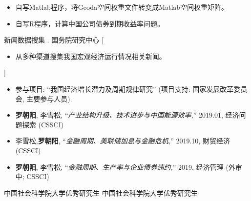 \documentclass[zh]{resume}
\begin{document}
\begin{itemize}
  \item 自写Matlab程序，将Geoda空间权重文件转变成Matlab空间权重矩阵。
  \item 自写R程序，计算中国公司债券到期收益率问题。
\end{itemize}
\begin{experiences}
    {新闻数据搜集 \@. 国务院研究中心}%
    [\begin{itemize}
      \item 从多种渠道搜集我国宏观经济运行情况相关新闻。
    \end{itemize}]%

\end{experiences}
\begin{itemize}
  \small
  \item 参与项目:
    \enquote{我国经济增长潜力及周期规律研究} (项目支持: 国家发展改革委员会, 主要参与人员).
  \item \textbf{罗朝阳}, 李雪松,
    \enquote{\it 产业结构升级、技术进步与中国能源效率,}
    2019.01, 经济问题探索 (CSSCI)
  \item 李雪松,\textbf{罗朝阳},
    \enquote{\it 金融周期、美联储加息与金融危机,}
    2019.10, 财贸经济 (CSSCI)
  \item \textbf{罗朝阳}, 李雪松,
    \enquote{\it 金融周期、生产率与企业债券违约,}
    2019, 经济管理 (外审中; CSSCI)
\end{itemize}

\begin{entries}
    {中国社会科学院大学优秀研究生}
    {中国社会科学院大学优秀研究生}
\end{entries}
\end{document}
